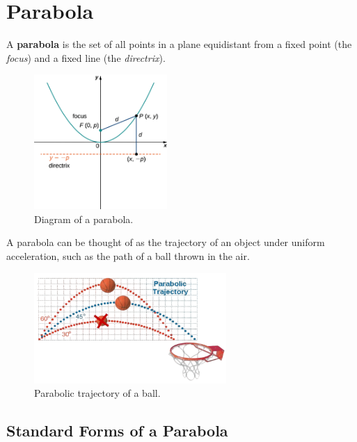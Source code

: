 \documentclass{article}
\begin{document}
\section*{Parabola}
\begin{definitionbox}
A \textbf{parabola} is the set of all points in a plane equidistant from a fixed point (the \textit{focus}) and a fixed line (the \textit{directrix}).
\begin{figure}[H]
    \centering
    \includegraphics[width=0.45\textwidth]{parabola.jpg}
    \caption{Diagram of a parabola.}
\end{figure}
\begin{intuitionbox}
    A parabola can be thought of as the trajectory of an object under uniform acceleration, such as the path of a ball thrown in the air.
    \begin{figure}[H]
        \centering
        \includegraphics[width=0.65\textwidth]{parabola_ball_example.png}
        \caption{Parabolic trajectory of a ball.}
    \end{figure}
    \end{intuitionbox}
\end{definitionbox}

\subsection*{Standard Forms of a Parabola}
\end{document}
